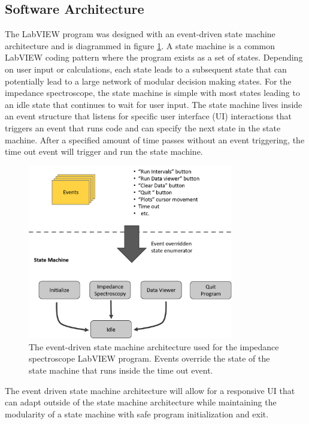 \subsection{Software Architecture}
\par The LabVIEW program was designed with an event-driven state machine architecture and is diagrammed in figure \ref{fig:event_driven_state_machine_architecture}. A state machine is a common LabVIEW coding pattern where the program exists as a set of states. Depending on user input or calculations, each state leads to a subsequent state that can potentially lead to a large network of modular decision making states. For the impedance spectroscope, the state machine is simple with most states leading to an idle state that continues to wait for user input. The state machine lives inside an event structure that listens for specific user interface (UI) interactions that triggers an event that runs code and can specify the next state in the state machine. After a specified amount of time passes without an event triggering, the time out event will trigger and run the state machine.    

\begin{figure}[h]
    \centering
    \includegraphics[width=0.8\textwidth]{images/program_overview.png}
    \caption[Event-driven state machine architecture]{The event-driven state machine architecture used for the impedance spectroscope LabVIEW program. Events override the state of the state machine that runs inside the time out event.}
    \label{fig:event_driven_state_machine_architecture}
\end{figure}

\par The event driven state machine architecture will allow for a responsive UI that can adapt outside of the state machine architecture while maintaining the modularity of a state machine with safe program initialization and exit. 

